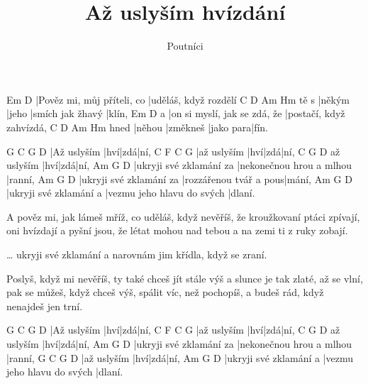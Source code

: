 \documentclass{song}
\title{Až uslyším hvízdání}
\author{Poutníci}
\begin{document}
\strophe
Em                         D
|Pověz mi, můj příteli, co |uděláš, když rozdělí
     C      D     Am               Hm
tě s |někým |jeho |smích jak žhavý |klín,
  Em                           D
a |on si myslí, jak se zdá, že |postačí, když zahvízdá,
     C      D        Am        Hm
hned |něhou |změkneš |jako para|fín.
\endstrophe

G           C   G   D
|Až uslyším |hví|zdá|ní,
C           F   C   G
|až uslyším |hví|zdá|ní,
           C   G   D
až uslyším |hví|zdá|ní,
Am                      G                        D
|ukryji své zklamání za |nekonečnou hrou a mlhou |ranní,
Am                      G                      D
|ukryji své zklamání za |rozzářenou tvář a pous|mání,
Am                     G                          D
|ukryji své zklamání a |vezmu jeho hlavu do svých |dlaní.
\endstrophe

\strophe*
A pověz mi, jak lámeš mříž, co uděláš, když nevěříš,
že kroužkovaní ptáci zpívají,
oni hvízdají a pyšní jsou, že létat mohou nad tebou
a na zemi ti z ruky zobají.
\endstrophe

\ldots{} ukryji své zklamání a narovnám jim křídla, když se zraní.
\endstrophe

\strophe*
Poslyš, když mi nevěříš, ty také chceš jít stále výš
a slunce je tak zlaté, až se vlní,
pak se můžeš, když chceš výš, spálit víc, než pochopíš,
a budeš rád, když nenajdeš jen trní.
\endstrophe

G           C   G   D
|Až uslyším |hví|zdá|ní,
C           F   C   G
|až uslyším |hví|zdá|ní,
           C   G   D
až uslyším |hví|zdá|ní, 
Am                      G                        D
|ukryji své zklamání za |nekonečnou hrou a mlhou |ranní,
G           C   G   D
|až uslyším |hví|zdá|ní,
Am                     G                          D
|ukryji své zklamání a |vezmu jeho hlavu do svých |dlaní.
\endstrophe
\end{document}
